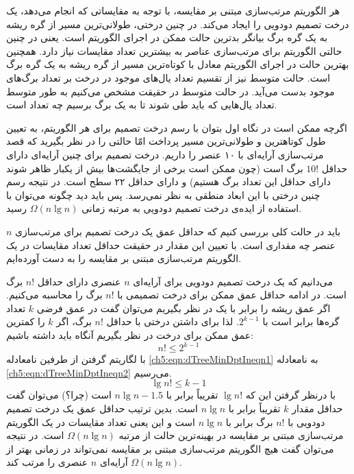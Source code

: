 هر الگوریتم مرتب‌سازی مبتنی بر مقایسه، با توجه به مقایساتی که انجام می‌دهد، یک درخت تصمیم دودویی را ایجاد می‌کند. در چنین درختی، طولانی‌ترین مسیر از گره ریشه به یک گره برگ بیانگر بدترین حالت ممکن در اجرای الگوریتم است. یعنی در چنین حالتی الگوریتم برای مرتب‌سازی عناصر به بیشترین تعداد مقایسات نیاز دارد. همچنین بهترین حالت در اجرای الگوریتم معادل با کوتاه‌ترین مسیر از گره ریشه به یک گره برگ است. حالت متوسط نیز از تقسیم تعداد یال‌های موجود در درخت بر تعداد برگ‌های موجود بدست می‌آید. در حالت متوسط در حقیقت مشخص می‌کنیم  به طور متوسط تعداد یال‌هایی که باید طی شوند تا به یک برگ برسیم چه تعداد است.

اگرچه ممکن است در نگاه اول بتوان با رسم درخت تصمیم برای هر الگوریتم، به تعیین طول کوتاهترین و طولانی‌ترین مسیر پرداخت امّا حالتی را در نظر بگیرید که قصد مرتب‌سازی آرایه‌ای با ۱۰ عنصر را داریم. درخت تصمیم برای چنین آرایه‌ای دارای حداقل {$10!$} برگ است (چون ممکن است برخی از جایگشت‌ها بیش از یکبار ظاهر شوند دارای حداقل این تعداد برگ هستیم) و دارای حداقل ۲۲ سطح است. در نتیجه رسم چنین درختی با این ابعاد منطقی به نظر نمی‌رسد. پس باید دید چگونه می‌توان با استفاده از ایده‌ی درخت تصمیم دودویی به مرتبه زمانی {$\Omega (n\lg n)$} رسید.

باید در حالت کلی بررسی کنیم که حداقل عمق یک درخت تصمیم برای مرتب‌سازی {$n$} عنصر چه مقداری است. با تعیین این مقدار در حقیقت حداقل تعداد مقایسات در یک الگوریتم مرتب‌سازی مبتنی بر مقایسه را به دست آورده‌ایم.

می‌دانیم که یک درخت تصمیم دودویی برای آرایه‌ای {$n$} عنصری دارای حداقل {$n!$} برگ است. در ادامه حداقل عمق ممکن برای درخت تصمیمی با {$n!$} برگ را محاسبه می‌کنیم. اگر عمق ریشه را برابر با یک در نظر بگیریم می‌توان گفت در عمق فرضی {$k$} تعداد گره‌ها برابر است با {$2^{k-1}$}. لذا برای داشتن درختی با حداقل {$n!$} برگ، اگر {$k$} را کمترین عمق ممکن برای درخت در نظر بگیریم آنگاه باید داشته باشیم:
\begin{equation}
n!\leq 2^{k-1}\label{ch5:eqn:dTreeMinDptIneqn1}
\end{equation}
با لگاریتم گرفتن از طرفین نامعادله {\eqref{ch5:eqn:dTreeMinDptIneqn1}} به نامعادله {\eqref{ch5:eqn:dTreeMinDptIneqn2}} می‌رسیم.
\begin{equation}
\lg n! \leq k-1\label{ch5:eqn:dTreeMinDptIneqn2}
\end{equation}
با درنظر گرفتن این که {$\lg n!$} تقریباً برابر با {$n\lg n -1.5$} است (چرا؟) می‌توان گفت حداقل مقدار {$k$} تقریباً برابر با {$n\lg n$} است. بدین ترتیب حداقل عمق یک درخت تصمیم دودویی با {$n!$} برگ برابر با {$n\lg n$} است و این یعنی تعداد مقایسات در یک الگوریتم مرتب‌سازی مبتنی بر مقایسه در بهینه‌ترین حالت از مرتبه {$\Omega (n\lg n)$} است. در نتیجه می‌توان گفت هیچ الگوریتم مرتب‌سازی مبتنی بر مقایسه نمی‌تواند در زمانی بهتر از {$\Omega (n\lg n)$} آرایه‌ای {$n$} عنصری را مرتب کند.

